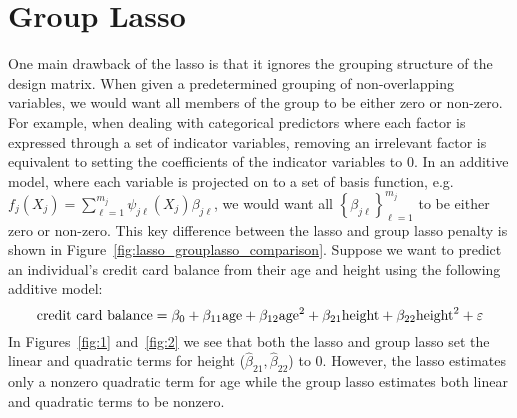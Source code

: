\section{Group Lasso}

One main drawback of the lasso is that it ignores the grouping structure of the design matrix. When given a predetermined grouping of non-overlapping variables, we would want all members of the group to be either zero or non-zero. For example, when dealing with categorical predictors where each factor is expressed through a set of indicator variables, removing an irrelevant factor is equivalent to setting the coefficients of the indicator variables to 0. In an additive model, where each variable is projected on to a set of basis function, e.g. $f_j(X_j) = \sum_{\ell = 1}^{m_j} \psi_{j\ell}(X_j) \beta_{j\ell}$, we would want all $\left\lbrace \beta_{j\ell}\right\rbrace_{\ell=1}^{m_j}$ to be either zero or non-zero. This key difference between the lasso and group lasso penalty is shown in Figure~\ref{fig:lasso_grouplasso_comparison}. 
Suppose we want to predict an individual's credit card balance from their age and height using the following additive model:
\begin{equation}
\textrm{{credit card balance}} = \beta_0 + \beta_{11}\textrm{{age}} + \beta_{12}\textrm{{age}}^2 + \beta_{21}\textrm{{height}} + \beta_{22}\textrm{{height}}^2 + \varepsilon \label{eq:credit_card}
\end{equation}  
In Figures~\ref{fig:1} and~\ref{fig:2} we see that both the lasso and group lasso set the linear and quadratic terms for height ($\hat\beta_{21},\hat\beta_{22}$) to 0. However, the lasso estimates only a nonzero quadratic term for age while the group lasso estimates both linear and quadratic terms to be nonzero. 

%

